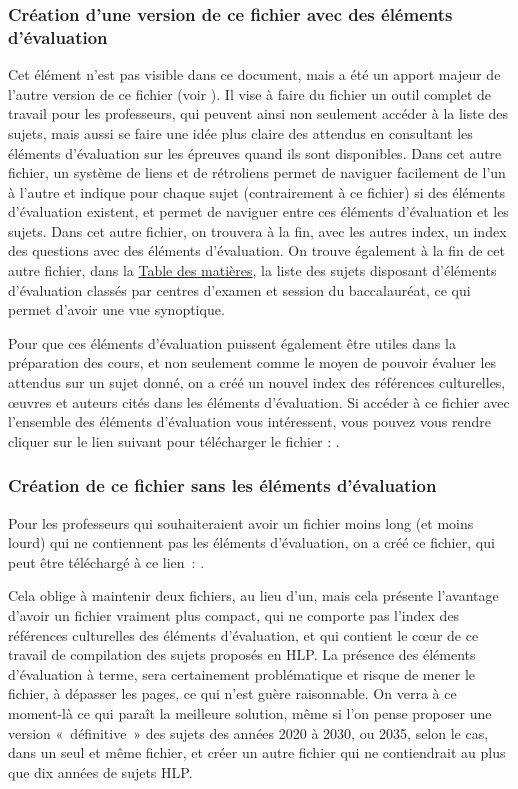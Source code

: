 \subsubsection{Création d'une version de ce fichier avec des éléments d'évaluation}

Cet élément n'est pas visible dans ce document, mais a été un apport majeur de l'autre version de ce fichier (voir \sujetshlpcorr). Il vise à faire du fichier un outil complet de travail pour les professeurs, qui peuvent ainsi non seulement accéder à la liste des sujets, mais aussi se faire une idée plus claire des attendus en consultant les éléments d'évaluation sur les épreuves quand ils sont disponibles. Dans cet autre fichier, un système de liens et de rétroliens permet de naviguer facilement de l'un à l'autre et indique pour chaque sujet (contrairement à ce fichier) si des éléments d'évaluation existent, et permet de naviguer entre ces éléments d'évaluation et les sujets. Dans cet autre fichier, on trouvera à la fin, avec les autres index, un index des questions avec des éléments d'évaluation. On trouve également à la fin de cet autre fichier, dans la \hyperlink{TdM}{Table des matières}, la liste des sujets disposant d'éléments d'évaluation classés par centres d'examen et session du baccalauréat, ce qui permet d'avoir une vue synoptique.

Pour que ces éléments d'évaluation puissent également être utiles dans la préparation des cours, et non seulement comme le moyen de pouvoir évaluer les attendus sur un sujet donné, on a créé un nouvel index des références culturelles, œuvres et auteurs cités dans les éléments d'évaluation. Si accéder à ce fichier avec l'ensemble des éléments d'évaluation vous intéressent, vous pouvez vous rendre cliquer sur le lien suivant pour télécharger le fichier : \sujetshlpcorr.

\subsubsection{Création de ce fichier sans les éléments d'évaluation}

Pour les professeurs qui souhaiteraient avoir un fichier moins long (et moins lourd) qui ne contiennent pas les éléments d'évaluation, on a créé ce fichier, qui peut être téléchargé à ce lien~: \sujetshlpsanscorr{}.

Cela oblige à maintenir deux fichiers, au lieu d'un, mais cela présente l'avantage d'avoir un fichier vraiment plus compact, qui ne comporte pas l'index des références culturelles des éléments d'évaluation, et qui contient le cœur de ce travail de compilation des sujets proposés en HLP. La présence des éléments d'évaluation à terme, sera certainement problématique et risque de mener le fichier, à dépasser les  pages, ce qui n'est guère raisonnable. On verra à ce moment-là ce qui paraît la meilleure solution, même si l'on pense proposer une version «~définitive~» des sujets des années 2020 à 2030, ou 2035, selon le cas, dans un seul et même fichier, et créer un autre fichier qui ne contiendrait au plus que dix années de sujets HLP.

